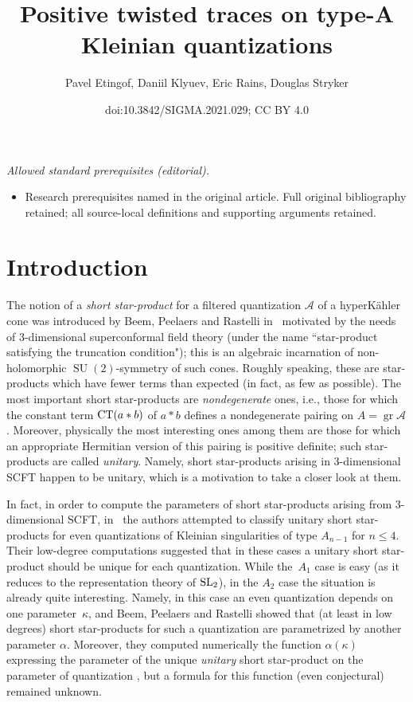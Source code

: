 \documentclass[10pt,a4paper]{amsart}
\title{Positive twisted traces on type-A Kleinian quantizations}
\author{Pavel Etingof, Daniil Klyuev, Eric Rains, Douglas Stryker}
\date{doi:10.3842/SIGMA.2021.029; CC BY 4.0}
\newcommand{\SU}{\mathop{\mathrm{SU}}\nolimits}
\theoremstyle{definition}
\numberwithin{equation}{section}
\begin{document}
\maketitle
\noindent\textit{Allowed standard prerequisites (editorial).}\begin{itemize}
\item Research prerequisites named in the original article. Full original bibliography retained; all source-local definitions and supporting arguments retained.
\end{itemize}\medskip
\section{Introduction}

The notion of a {\it short star-product} for a filtered quantization $\mathcal A$ of a hyperK\"ahler cone was introduced by Beem, Peelaers and Rastelli in~\cite{BPR} motivated by the needs of 3-dimensional super\-conformal field theory (under the name ``star-product satisfying the truncation condition"); this is an algebraic incarnation of non-holomorphic $\SU(2)$-symmetry of such cones. Roughly speaking, these are star-products which have fewer terms than expected (in fact, as few as possible). The most important short star-products are {\it nondegenerate} ones, i.e., those for which the constant term ${\rm CT}(a*b)$ of $a*b$ defines a nondegenerate pairing on $A=\operatorname{gr} \mathcal A$. Moreover, physically the most interesting ones among them are those for which an appropriate Hermitian version of this pairing is positive definite; such star-products are called {\it unitary}. Namely, short star-products arising in 3-dimensional SCFT happen to be unitary, which is a motivation to take a closer look at them.

In fact, in order to compute the parameters of short star-products arising from 3-dimensional SCFT, in~\cite{BPR} the authors attempted to classify unitary short star-products for even quantizations of Kleinian singularities of type $A_{n-1}$ for $n\le 4$. Their low-degree computations suggested that in these cases a unitary short star-product should be unique for each quantization. While the~$A_1$ case is easy (as it reduces to the representation theory of ${\rm SL}_2$),
in the $A_2$ case the situation is already quite interesting. Namely, in this case an even quantization depends on one parameter~$\kappa$, and
Beem, Peelaers and Rastelli showed that (at least in low degrees) short star-products for such a quantization are parametrized by another parameter $\alpha$. Moreover, they computed numerically the function $\alpha(\kappa)$ expressing the parameter of the unique {\it unitary} short star-product on the parameter of quantization \cite[Fig.~2]{BPR}, but a formula for this function (even conjectural) remained unknown.
\end{document}
